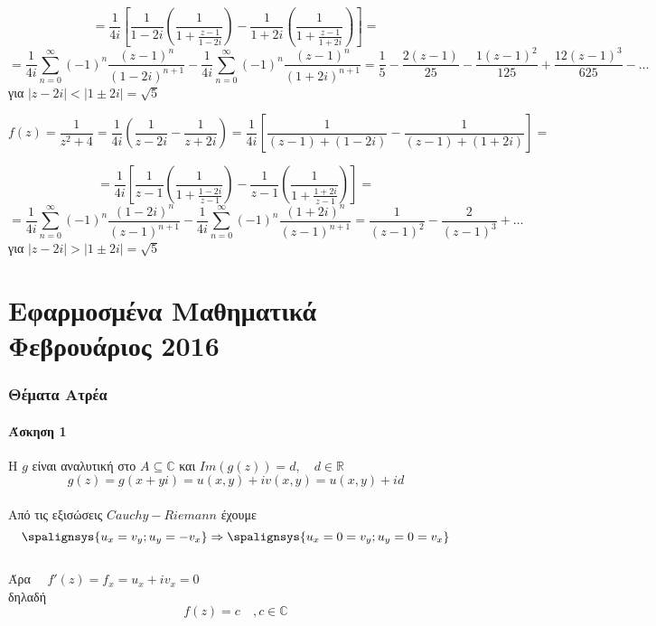 \documentclass[12pt]{article}
\begin{document}
$$
=
\frac{1}{4i}\left[\frac{1}{1-2i} \left( \frac{1}{1+\frac{z-1}{1-2i} } \right) -
\frac{1}{1+2i} \left(  \frac{1}{1+\frac{z-1}{1+2i}}\right)\right]=
$$
$$
=\frac{1}{4i}\sum_{n=0}^{\infty}(-1)^n
\frac{(z-1)^n}{(1-2i)^{n+1}}-
\frac{1}{4i}\sum_{n=0}^{\infty}(-1)^n
\frac{(z-1)^n}{(1+2i)^{n+1}}=\frac{1}{5}-\frac{2(z-1)}{25}-\frac{1(z-1)^2}{125}+\frac{12(z-1)^3}{625}-\ldots
$$
για $|z-2i|<|1\pm2i|=\sqrt{5}$




$$ f(z)=\frac{1}{z^2+4}= \frac{1}{4i}\left( \frac{1}{z-2i} - \frac{1}{z+2i} \right) = \frac{1}{4i}\left[ \frac{1}{(z-1)+(1-2i)} - \frac{1}{(z-1)+(1+2i)} \right] =$$

$$
=
\frac{1}{4i}\left[\frac{1}{z-1} \left( \frac{1}{1+\frac{1-2i}{z-1} } \right) -
\frac{1}{z-1} \left( \frac{1}{1+\frac{1+2i}{z-1} }\right)
\right]=
$$
$$
=\frac{1}{4i}\sum_{n=0}^{\infty}(-1)^n
\frac{(1-2i)^n}{(z-1)^{n+1}}-
\frac{1}{4i}\sum_{n=0}^{\infty}(-1)^n
\frac{(1+2i)^n}{(z-1)^{n+1}}=\frac{1}{(z-1)^2}-\frac{2}{(z-1)^3}+\ldots
$$
για $|z-2i|>|1\pm2i|=\sqrt{5}$

\newpage
 


\newpage \part{Εφαρμοσμένα Μαθηματικά Φεβρουάριος 2016}

  

\maketitle
\newpage
 



 \section{Θέματα Ατρέα}

 \subsection{Άσκηση 1}

Η $g$ είναι αναλυτική στο $Α\subseteq \mathbb{C}$ και $Im\left(g(z)\right)=d, \quad d \in\mathbb{R}$
\\
$$ g(z)=g(x+yi)=u(x,y)+iv(x,y)=u(x,y)+id $$
\\
Από τις εξισώσεις $Cauchy-Riemann$ έχουμε
\\
\[
\spalignsys {u_x=v_y;u_y=-v_x} \Rightarrow    
\spalignsys {u_x=0=v_y;u_y=0=v_x }
\]
\\
Άρα $\quad f'(z)=f_x=u_x+iv_x=0 $
\\ δηλαδή $$ f(z)=c \quad ,c \in \mathbb{C} $$
\end{document}
